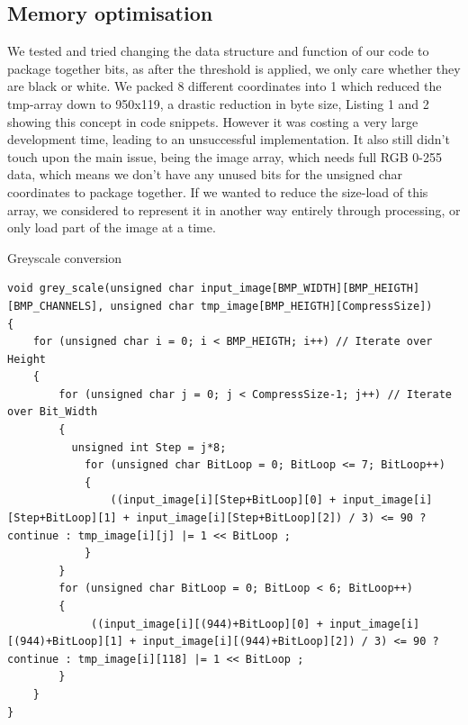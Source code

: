 \documentclass[a4paper, english]{article}
\numberwithin{equation}{section}
\begin{document}
\subsection{Memory optimisation}
We tested and tried changing the data structure and function of our code to package together bits, as after the threshold is applied, we only care whether they are black or white. We packed 8 different coordinates into 1 which reduced the tmp-array down to 950x119, a drastic reduction in byte size, Listing 1 and 2 showing this concept in code snippets. However it was costing a very large development time, leading to an unsuccessful implementation. It also still didn't touch upon the main issue, being the image array, which needs full RGB 0-255 data, which means we don't have any unused bits for the unsigned char coordinates to package together. If we wanted to reduce the size-load of this array, we considered to represent it in another way entirely through processing, or only load part of the image at a time.
\begin{listing}[H]
\caption{Greyscale conversion}\label{lst:grey-scale}
    \begin{verbatim}
void grey_scale(unsigned char input_image[BMP_WIDTH][BMP_HEIGTH][BMP_CHANNELS], unsigned char tmp_image[BMP_HEIGTH][CompressSize])
{
    for (unsigned char i = 0; i < BMP_HEIGTH; i++) // Iterate over Height
    {
        for (unsigned char j = 0; j < CompressSize-1; j++) // Iterate over Bit_Width
        {
		  unsigned int Step = j*8;
		    for (unsigned char BitLoop = 0; BitLoop <= 7; BitLoop++)
            {
                ((input_image[i][Step+BitLoop][0] + input_image[i][Step+BitLoop][1] + input_image[i][Step+BitLoop][2]) / 3) <= 90 ? continue : tmp_image[i][j] |= 1 << BitLoop ; 
		    }                                                                                                    
        }
        for (unsigned char BitLoop = 0; BitLoop < 6; BitLoop++)
        {
             ((input_image[i][(944)+BitLoop][0] + input_image[i][(944)+BitLoop][1] + input_image[i][(944)+BitLoop][2]) / 3) <= 90 ? continue : tmp_image[i][118] |= 1 << BitLoop ;
        }
    }
}
\end{verbatim}
\end{listing}
\end{document}
